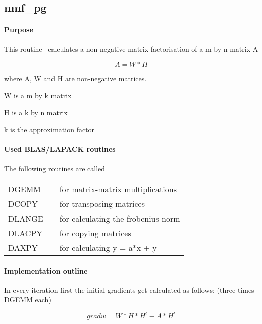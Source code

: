 \documentclass[a4paper,10pt]{scrartcl}
\begin{document}
		\subsection{nmf\_pg}

			\paragraph{Purpose}

					This routine~\cite{lin2007} calculates a non negative matrix factorisation of a m by n 
					matrix A\newline
					
					\begin{equation*}
						A = W * H
					\end{equation*}

 					where A, W and H are non-negative matrices.

 					W is a m by k matrix

 					H is a k by n matrix

 					k is the approximation factor



			\paragraph{Used BLAS/LAPACK routines}

					The following routines are called\newline

					\begin{tabular}{lcl}
						DGEMM && for matrix-matrix multiplications\\
						DCOPY && for transposing matrices\\
						DLANGE && for calculating the frobenius norm\\
						DLACPY && for copying matrices\\
						DAXPY && for calculating y = a*x + y\\
					\end{tabular}

			\paragraph{Implementation outline}


					In every iteration first the initial gradients get calculated as 
					follows: (three times DGEMM each)\newline

					\begin{equation*}
						gradw = W * H * H^t - A * H^t
					\end{equation*}
					
\end{document}
